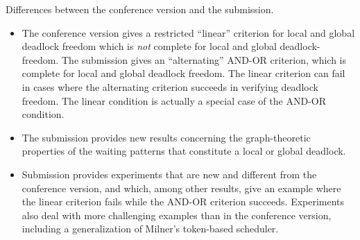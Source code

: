 \documentclass[11pt]{article}
\begin{document}
\begin{center}
\Large{Differences between the conference version and the submission.}
\end{center}

\begin{itemize}


\item The conference version gives a restricted ``linear'' criterion for local and global deadlock freedom which is \emph{not} complete for local and
  global deadlock-freedom.  The
  submission gives an ``alternating'' AND-OR criterion, which is complete for local and global deadlock freedom. The linear criterion can fail in
  cases where the alternating criterion succeeds in verifying deadlock freedom. The linear condition is actually a special case of the AND-OR condition.

\item The submission provides new results concerning the graph-theoretic properties of the waiting patterns that constitute a local or global deadlock.

\item Submission provides experiments that are new and different from the conference version, and which, among other results, give an example where
  the linear criterion fails while the AND-OR criterion succeeds. Experiments also deal with more challenging examples than in the conference version,
  including a generalization of Milner's token-based scheduler.

\end{itemize}
\end{document}
